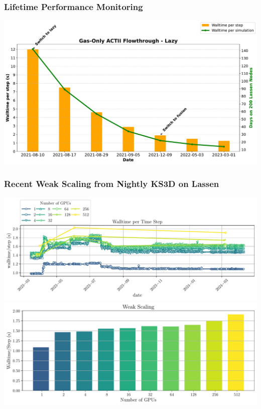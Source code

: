 \begin{frame}\frametitle{Lifetime Performance Monitoring}
\centering
\includegraphics[width=.8\textwidth]{Figures/mtc/gas-only-perf.pdf}
\end{frame}

\begin{frame}\frametitle{Recent Weak Scaling from Nightly KS3D on Lassen}
\begin{center}
  \includegraphics[width=.6\textwidth]{Figures/mtc/NightlyWeak.pdf}
  \includegraphics[width=.6\textwidth]{Figures/mtc/weak_scaling_NightlyWeak.pdf}
\end{center}
\end{frame}


